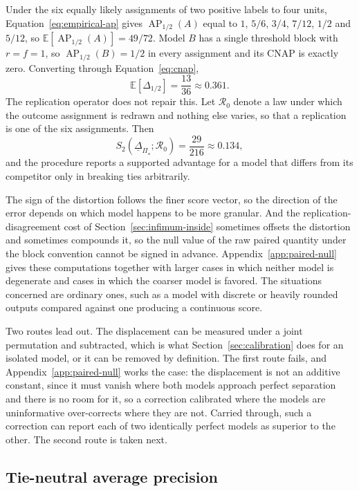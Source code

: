 \documentclass[11pt]{article}
\newcommand{\AP}{\operatorname{AP}}
\newcommand{\Regime}{\mathcal{R}}
\newcommand{\PSet}{\Pi_\star}
\newcommand{\E}{\mathbb{E}}
\newcommand{\RobDelta}{\underline{\Delta}_{\PSet}}
\theoremstyle{remark}
\begin{document}
Under the six equally likely assignments of two positive labels to four units, Equation~\eqref{eq:empirical-ap} gives $\AP_{1/2}(A)$ equal to $1$, $5/6$, $3/4$, $7/12$, $1/2$ and $5/12$, so $\E[\AP_{1/2}(A)]=49/72$. Model $B$ has a single threshold block with $r=f=1$, so $\AP_{1/2}(B)=1/2$ in every assignment and its CNAP is exactly zero. Converting through Equation~\eqref{eq:cnap},
\[
\E\left[\Delta_{1/2}\right]
=
\frac{13}{36}
\approx
0.361 .
\]
The replication operator does not repair this. Let $\Regime_0$ denote a law under which the outcome assignment is redrawn and nothing else varies, so that a replication is one of the six assignments. Then
\[
S_2(\RobDelta;\Regime_0)
=
\frac{29}{216}
\approx
0.134 ,
\]
and the procedure reports a supported advantage for a model that differs from its competitor only in breaking ties arbitrarily.

The sign of the distortion follows the finer score vector, so the direction of the error depends on which model happens to be more granular. And the replication-disagreement cost of Section~\ref{sec:infimum-inside} sometimes offsets the distortion and sometimes compounds it, so the null value of the raw paired quantity under the block convention cannot be signed in advance. Appendix~\ref{app:paired-null} gives these computations together with larger cases in which neither model is degenerate and cases in which the coarser model is favored. The situations concerned are ordinary ones, such as a model with discrete or heavily rounded outputs compared against one producing a continuous score.

Two routes lead out. The displacement can be measured under a joint permutation and subtracted, which is what Section~\ref{sec:calibration} does for an isolated model, or it can be removed by definition. The first route fails, and Appendix~\ref{app:paired-null} works the case: the displacement is not an additive constant, since it must vanish where both models approach perfect separation and there is no room for it, so a correction calibrated where the models are uninformative over-corrects where they are not. Carried through, such a correction can report each of two identically perfect models as superior to the other. The second route is taken next.

\subsection{Tie-neutral average precision}
\label{sec:paired-convention}
\end{document}
